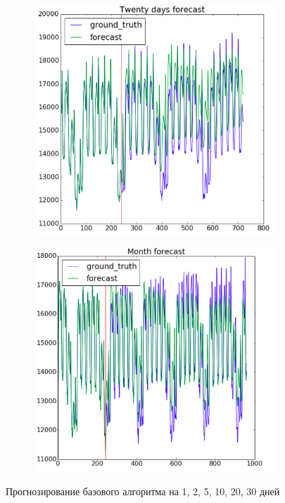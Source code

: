 \documentclass[12pt,fleqn,unicode]{article}
\begin{document}
\begin{figure}[H]
\begin{subfigure}[b]{0.3\textwidth}
    \end{subfigure}
    \begin{subfigure}[b]{0.3\textwidth}
        \includegraphics[width=\textwidth]{twentydays.png}
    \end{subfigure}
    \begin{subfigure}[b]{0.3\textwidth}
        \includegraphics[width=\textwidth]{month.png}
    \end{subfigure}
    \caption{Прогнозирование базового алгоритма на 1, 2, 5, 10, 20, 30 дней}
    \label{fig:forecast}
\end{figure}
\end{document}
